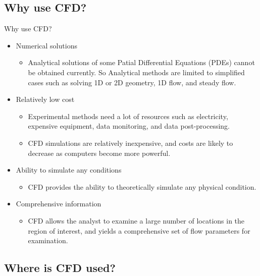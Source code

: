 \documentclass[10pt]{beamer}
\begin{document}
\subsection{Why use CFD?}


\begin{frame}{Why use CFD?}

\begin{itemize}
\justifying
\item[\ding{113}] Numerical solutions
\begin{itemize}
\justifying
\item[\ding{252}] Analytical solutions of some Patial Differential Equations (PDEs) cannot be obtained currently. So Analytical methods are limited to simplified cases
such as solving 1D or 2D geometry, 1D flow, and steady flow.
\end{itemize}
\item[\ding{113}] Relatively low cost
\begin{itemize}
\justifying
\item[\ding{252}] Experimental methods need a lot of resources such as electricity, expensive equipment, data monitoring, and data post-processing.
\justifying
\item[\ding{252}] CFD simulations are relatively inexpensive, and costs are likely to decrease as computers become more powerful.
\end{itemize}
\item[\ding{113}] Ability to simulate any conditions
\begin{itemize}
\justifying
\item[\ding{252}] CFD provides the ability to theoretically simulate any physical condition.
\end{itemize}
\item[\ding{113}] Comprehensive information
\begin{itemize}
\justifying
\item[\ding{252}] CFD allows the analyst to examine a large number of locations in the region of interest, and yields a comprehensive set of flow parameters for examination.
\end{itemize}
\end{itemize}
\end{frame}

\subsection{Where is CFD used?}
\end{document}
